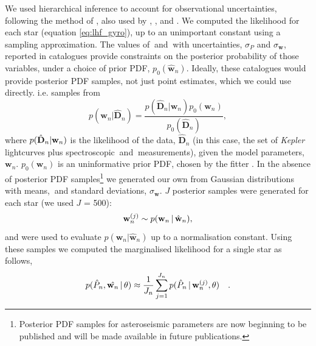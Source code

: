We used hierarchical inference to account for observational uncertainties,
following the method of \citet{Hogg2010}, also used by
\citet{Foreman-Mackey2014}, \citet{Rogers2014}, \citet{Morton2014} and
\citet{Demory2014}.
We computed the likelihood for each star (equation \ref{eq:lhf_gyro}), up to
an unimportant constant using a sampling approximation.
The values of \ph$~$and \wh$~$with uncertainties, $\sigma_P$ and
$\sigma_{\mathbf{w}}$, reported in catalogues provide constraints on the
posterior probability of those variables, under a choice of prior PDF,
$p_0(\hat{\mathbf{w}}_n)$.
Ideally, these catalogues would provide posterior PDF samples, not just point
estimates, which we could use directly.
i.e. samples from
\begin{equation}
	p(\mathbf{w}_n|\hat{\mathbf{D}}_n) =
	\frac{p(\hat{\mathbf{D}}_n|\mathbf{w}_n)p_0(\mathbf{w}_n)}
	{p_0(\hat{\mathbf{D}}_n)},
\end{equation}
where $p(\hat{\mathbf{D}}_n|\mathbf{w}_n)$ is the likelihood of the data,
$\hat{\mathbf{D}}_n$ (in this case,
the set of {\it Kepler} lightcurves plus spectroscopic \teff$~$and
\feh$~$measurements), given the model parameters, $\mathbf{w}_n$.
$p_0(\mathbf{w}_n)$ is an uninformative prior PDF, chosen by the
fitter \citep[][used a flat prior PDF in age and \logg]{Chaplin2014}.
In the absence of posterior PDF samples\footnote{Posterior PDF samples
for asteroseismic parameters are now beginning to be published and will be made
available in future publications.} we generated our own from Gaussian
distributions with means, \wh$~$and standard deviations, $\sigma_{\mathbf{w}}$.
$J$ posterior samples were generated for each star (we used $J$ = 500):
\begin{equation}
\mathbf{w}_n^{(j)} \sim p(\mathbf{w}_n\,|\,\hat{\mathbf{w}}_n),
\end{equation}
and were used to evaluate $p(\mathbf{w}_n|\hat{\mathbf{w}}_n)$ up to a
normalisation constant.
Using these samples we computed the marginalised likelihood for a single
star as follows,
\begin{align}
	p(\hat{P}_n,\hat{\mathbf{w}_n}\,|\,\theta) \approx \frac{1}{J_n}
	\sum_{j=1}^{J_n}p(\hat{P}_n\,|\,\mathbf{w}_n^{(j)},\theta) \quad.
\end{align}
